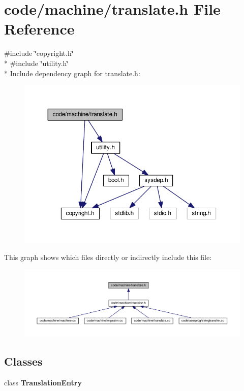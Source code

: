 \section{code/machine/translate.h File Reference}
\label{translate_8h}
{\ttfamily \#include \char`\"{}copyright.\+h\char`\"{}}\\*
{\ttfamily \#include \char`\"{}utility.\+h\char`\"{}}\\*
Include dependency graph for translate.\+h\+:
\nopagebreak
\begin{figure}[H]
\begin{center}
\leavevmode
\includegraphics[width=350pt]{translate_8h__incl}
\end{center}
\end{figure}
This graph shows which files directly or indirectly include this file\+:
\nopagebreak
\begin{figure}[H]
\begin{center}
\leavevmode
\includegraphics[width=350pt]{translate_8h__dep__incl}
\end{center}
\end{figure}
\subsection*{Classes}
\begin{DoxyCompactItemize}
\item 
class {\bf Translation\+Entry}
\end{DoxyCompactItemize}
